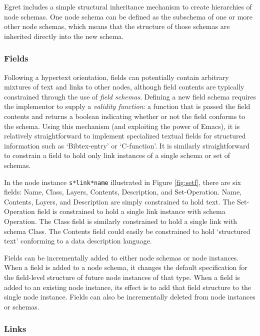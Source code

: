 Egret includes a simple structural inheritance mechanism to create hierarchies of node schemas.  One node schema can be defined as the subschema of one or more other node schemas, which means that the structure of those schemas are inherited directly into the new schema.

\subsubsection{Fields}

Following a hypertext orientation, fields can potentially contain arbitrary mixtures of text and links to other nodes, although field contents are typically constrained through the use of {\em field schemas}.  Defining a new field schema requires the implementor to supply a {\em validity function}: a function that is passed the field contents and returns a boolean indicating whether or not the field conforms to the schema.  Using this mechanism (and exploiting the power of Emacs), it is relatively straightforward to implement specialized textual fields for structured information such as `Bibtex-entry' or `C-function'.  It is similarly straightforward to constrain a field to hold only link instances of a single schema or set of schemas.

In the node instance {\tt s*link*name} illustrated in Figure \ref{fig:setf}, there are six fields: Name, Class, Layers, Contents, Description, and Set-Operation.  Name, Contents, Layers, and Description are simply constrained to hold text.  The Set-Operation field is constrained to hold a single link instance with schema Operation.  The Class field is similarly constrained to hold a single link with schema Class.  The Contents field could easily be constrained to hold `structured text' conforming to a data description language.

Fields can be incrementally added to either node schemas or node instances.  When a field is added to a node schema, it changes the default specification for the field-level structure of future node instances of that type. When a field is added to an existing node instance, its effect is to add that field structure to the single node instance. Fields can also be incrementally deleted from node instances or schemas.

\subsubsection{Links}

